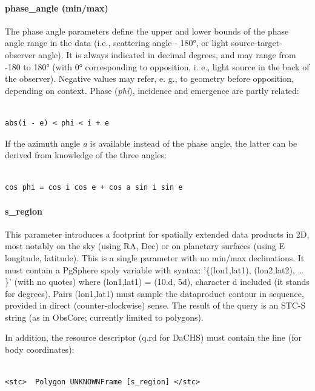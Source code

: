 \documentclass[11pt,a4paper]{ivoa}
\begin{document}
\paragraph{phase\_angle (min/max)}

The phase angle parameters define the upper and lower bounds of the phase angle range in the data (i.e., scattering angle - 180°, or light source-target-observer angle). It is always indicated in decimal degrees, and may range from -180 to 180° (with 0° corresponding to opposition, i. e., light source in the back of the observer). Negative values may refer, e. g., to geometry before opposition, depending on context. Phase (\emph{phi}), incidence and emergence are partly related:

\begin{verbatim}

abs(i - e) < phi < i + e

\end{verbatim}

If the azimuth angle \emph{a} is available instead of the phase angle, the latter can be derived from knowledge of the three angles:

\begin{verbatim}

cos phi = cos i cos e + cos a sin i sin e

\end{verbatim}

\paragraph{s\_region}

This parameter introduces a footprint for spatially extended data products in 2D, most notably on the sky (using RA, Dec) or on planetary surfaces (using E longitude, latitude). This is a single parameter with no min/max declinations. It must contain a PgSphere spoly variable with syntax: '\{(lon1,lat1), (lon2,lat2), … \}' (with no quotes) where (lon1,lat1) = (10.d, 5d), character d included (it stands for degrees). Pairs (lon1,lat1) must sample the dataproduct contour in sequence, provided in direct (counter-clockwise) sense. The result of the query is an STC-S string (as in ObsCore; currently limited to polygons).

In addition, the resource descriptor (q.rd for DaCHS) must contain the line (for body coordinates):

\begin{verbatim}

<stc>  Polygon UNKNOWNFrame [s_region] </stc>

\end{verbatim}
\end{document}
